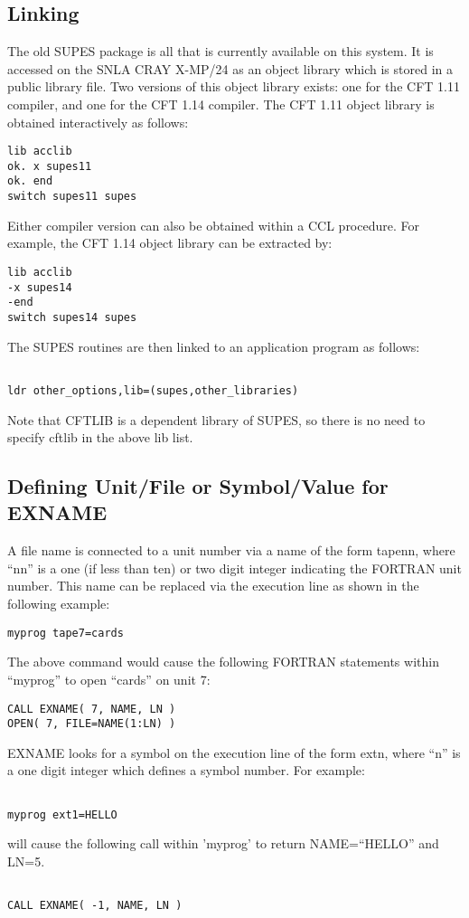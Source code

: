 \subsection{Linking}
The old SUPES package is all that is currently available on this system.
It is accessed on the SNLA CRAY X-MP/24 as an object library
which is stored in a public library file.  Two versions of this object
library exists: one for the CFT 1.11 compiler, and one for the CFT 1.14
compiler.  The CFT 1.11 object library is obtained interactively as follows:
\begin{verbatim}
lib acclib
ok. x supes11
ok. end
switch supes11 supes
\end{verbatim}

Either compiler version can also be obtained within a CCL procedure.  For
example, the CFT 1.14 object library can be extracted by:
\begin{verbatim}
lib acclib
-x supes14
-end
switch supes14 supes
\end{verbatim}

The SUPES routines are then linked to an application program as follows:
\begin{verbatim}

ldr other_options,lib=(supes,other_libraries)

\end{verbatim}
Note that CFTLIB is a dependent library of SUPES, so there is no need to
specify cftlib in the above lib list.


\subsection{Defining Unit/File or Symbol/Value for EXNAME}
A file name is connected to a unit number via a name of the form tapenn,
where ``nn'' is a one (if less than ten) or two digit integer indicating the
FORTRAN unit number. This name can be replaced via the execution line as
shown in the following example:

\verb+myprog tape7=cards+

The above command would cause the following FORTRAN statements within
``myprog'' to open ``cards'' on unit 7:
\begin{verbatim}
CALL EXNAME( 7, NAME, LN )
OPEN( 7, FILE=NAME(1:LN) )
\end{verbatim}

EXNAME looks for a symbol on the execution line of the form extn, where
``n'' is a one digit integer which defines a symbol number.  For example: 
\begin{verbatim}

myprog ext1=HELLO

\end{verbatim}
will cause the following call within 'myprog' to return NAME=``HELLO'' and
LN=5.
\begin{verbatim}

CALL EXNAME( -1, NAME, LN )
\end{verbatim}

